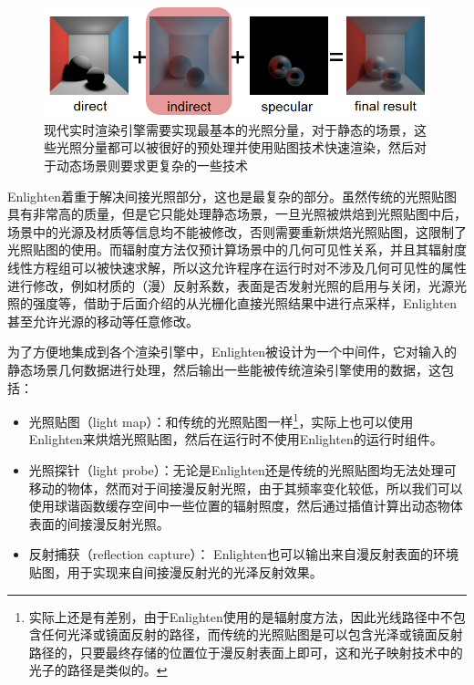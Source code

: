 \begin{figure}
	\includegraphics[width=1.0\textwidth]{figures/r/real-time-gi}
	\caption{现代实时渲染引擎需要实现最基本的光照分量，对于静态的场景，这些光照分量都可以被很好的预处理并使用贴图技术快速渲染，然后对于动态场景则要求更复杂的一些技术}
	\label{f:r-real-time-gi}
\end{figure}

Enlighten着重于解决间接光照部分，这也是最复杂的部分。虽然传统的光照贴图具有非常高的质量，但是它只能处理静态场景，一旦光照被烘焙到光照贴图中后，场景中的光源及材质等信息均不能被修改，否则需要重新烘焙光照贴图，这限制了光照贴图的使用。而辐射度方法仅预计算场景中的几何可见性关系，并且其辐射度线性方程组可以被快速求解，所以这允许程序在运行时对不涉及几何可见性的属性进行修改，例如材质的（漫）反射系数，表面是否发射光照的启用与关闭，光源光照的强度等，借助于后面介绍的从光栅化直接光照结果中进行点采样，Enlighten甚至允许光源的移动等任意修改。

为了方便地集成到各个渲染引擎中，Enlighten被设计为一个中间件，它对输入的静态场景几何数据进行处理，然后输出一些能被传统渲染引擎使用的数据，这包括：

\begin{itemize}
	\item 光照贴图（light map）：和传统的光照贴图一样\footnote{实际上还是有差别，由于Enlighten使用的是辐射度方法，因此光线路径中不包含任何光泽或镜面反射的路径，而传统的光照贴图是可以包含光泽或镜面反射路径的，只要最终存储的位置位于漫反射表面上即可，这和光子映射技术中的光子的路径是类似的。}，实际上也可以使用Enlighten来烘焙光照贴图，然后在运行时不使用Enlighten的运行时组件。
	\item 光照探针（light probe）：无论是Enlighten还是传统的光照贴图均无法处理可移动的物体，然而对于间接漫反射光照，由于其频率变化较低，所以我们可以使用球谐函数缓存空间中一些位置的辐射照度，然后通过插值计算出动态物体表面的间接漫反射光照。
	\item 反射捕获（reflection capture）： Enlighten也可以输出来自漫反射表面的环境贴图，用于实现来自间接漫反射光的光泽反射效果。
\end{itemize}

